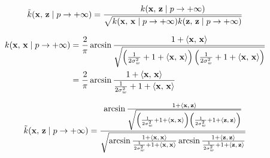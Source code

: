 \begin{equation}\label{eq:normalized}
	\tilde{k}(\mathbf{x},\,\mathbf{z} \mid p \to + \infty) = \frac{
		k(\mathbf{x},\,\mathbf{z} \mid p \to + \infty) }{
		\sqrt{
			k(\mathbf{x},\,\mathbf{x} \mid p \to + \infty)
			k(\mathbf{z},\,\mathbf{z} \mid p \to + \infty)
		}
	}
\end{equation}

\begin{align*}\label{eq:kernel_asin_xx}
	k(\mathbf{x},\,\mathbf{x} \mid p \to + \infty)
	 & = \frac{2}{\pi}
	\arcsin \frac{1 + \left\langle \mathbf{x},\,\mathbf{x} \right\rangle}{\sqrt{
			\left(
			\frac{1}{2\sigma_w^2} + 1 + \left\langle \mathbf{x},\,\mathbf{x} \right\rangle
			\right)
			\left(
			\frac{1}{2\sigma_w^2} + 1 + \left\langle \mathbf{x},\,\mathbf{x} \right\rangle
			\right)
	}}                 \\
	 & = \frac{2}{\pi}
	\arcsin \frac{1 + \left\langle \mathbf{x},\,\mathbf{x} \right\rangle}{
		\frac{1}{2\sigma_w^2} + 1 + \left\langle \mathbf{x},\,\mathbf{x} \right\rangle
	}                  \\
\end{align*}

\begin{equation}
	\tilde{k}(\mathbf{x},\,\mathbf{z} \mid p \to + \infty) =
	\frac{
		\arcsin \frac{1 + \left\langle \mathbf{x},\,\mathbf{z} \right\rangle}{\sqrt{
				\left(
				\frac{1}{2\sigma_w^2} + 1 + \left\langle \mathbf{x},\,\mathbf{x} \right\rangle
				\right)
				\left(
				\frac{1}{2\sigma_w^2} + 1 + \left\langle \mathbf{z},\,\mathbf{z} \right\rangle
				\right)
			}}
	}{
		\sqrt{
			\arcsin \frac{1 + \left\langle \mathbf{x},\,\mathbf{x} \right\rangle}{
				\frac{1}{2\sigma_w^2} + 1 + \left\langle \mathbf{x},\,\mathbf{x} \right\rangle
			}
			\arcsin \frac{1 + \left\langle \mathbf{z},\,\mathbf{z} \right\rangle}{
				\frac{1}{2\sigma_w^2} + 1 + \left\langle \mathbf{z},\,\mathbf{z} \right\rangle
			}
		}
	}
\end{equation}


